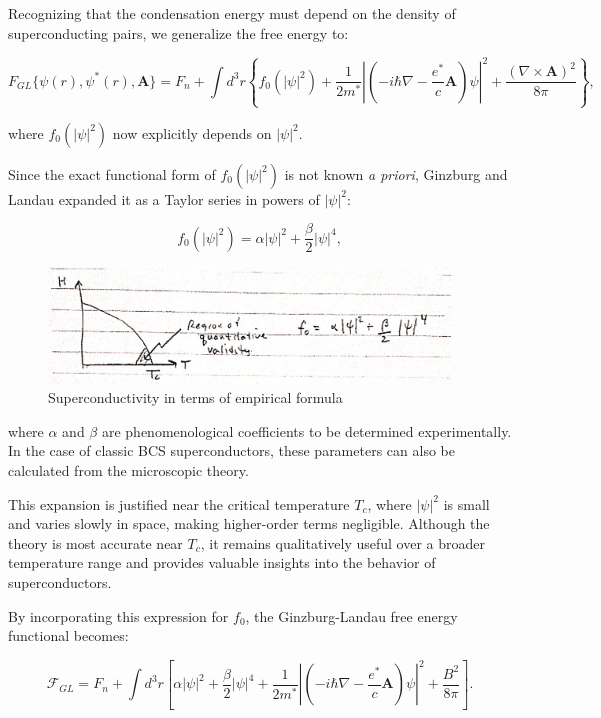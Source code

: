 \documentclass{article}
\begin{document}
Recognizing that the condensation energy must depend on the density of superconducting pairs, we generalize the free energy to:

\[
F_{GL}\{\psi(r), \psi^*(r), \mathbf{A}\} = F_n + \int d^3r \left\{ f_0(|\psi|^2) + \frac{1}{2m^*} \left| \left( -i \hbar \nabla - \frac{e^*}{c} \mathbf{A} \right) \psi \right|^2 + \frac{(\nabla \times \mathbf{A})^2}{8\pi} \right\},
\]

where \(f_0(|\psi|^2)\) now explicitly depends on \(|\psi|^2\).

Since the exact functional form of \(f_0(|\psi|^2)\) is not known \emph{a priori}, Ginzburg and Landau expanded it as a Taylor series in powers of \(|\psi|^2\):

\[
f_0(|\psi|^2) = \alpha |\psi|^2 + \frac{\beta}{2} |\psi|^4,
\]

\begin{figure}
    \begin{center}
        \includegraphics[width=0.95\textwidth]{figures/8.png}
    \end{center}
    \caption{Superconductivity in terms of empirical formula}\label{fig:}
\end{figure}


where \(\alpha\) and \(\beta\) are phenomenological coefficients to be determined experimentally. In the case of classic BCS superconductors, these parameters can also be calculated from the microscopic theory.

This expansion is justified near the critical temperature \(T_c\), where \(|\psi|^2\) is small and varies slowly in space, making higher-order terms negligible. Although the theory is most accurate near \(T_c\), it remains qualitatively useful over a broader temperature range and provides valuable insights into the behavior of superconductors.

By incorporating this expression for \(f_0\), the Ginzburg-Landau free energy functional becomes:

\[
\mathcal{F}_{GL} = F_n + \int d^3r \left[ \alpha |\psi|^2 + \frac{\beta}{2} |\psi|^4 + \frac{1}{2m^*} \left| \left( -i \hbar \nabla - \frac{e^*}{c} \mathbf{A} \right) \psi \right|^2 + \frac{B^2}{8\pi} \right].
\]
\end{document}
